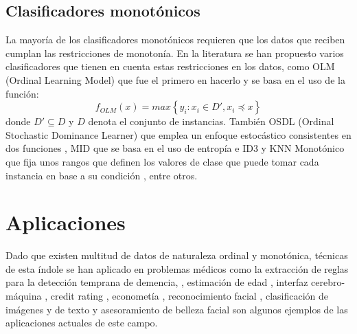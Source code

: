 \subsection{Clasificadores monotónicos}
La mayoría de los clasificadores monotónicos requieren que los datos que reciben cumplan las restricciones de monotonía. En la literatura se han propuesto varios clasificadores que tienen en cuenta estas restricciones en los datos, como OLM (Ordinal Learning Model) \cite{ben1989learning} que fue el primero en hacerlo y se basa en el uso de la función: $$ f_{OLM}(x) = max \left\{ y_i: x_i \in D', x_i \preceq x \right\}$$ donde $D' \subseteq D $ y $D$ denota el conjunto de instancias. También OSDL (Ordinal Stochastic Dominance Learner) que emplea un enfoque estocástico consistentes en dos funciones \cite{lievens2008probabilistic}, MID que se basa en el uso de entropía e ID3 \cite{ben1995monotonicity} y KNN Monotónico que fija unos rangos que definen los valores de clase que puede tomar cada instancia en base a su condición \cite{duivesteijn2008nearest}, entre otros.
\section{Aplicaciones}
Dado que existen multitud de datos de naturaleza ordinal y monotónica, técnicas de esta índole se han aplicado en problemas médicos \cite{bender1997ordinal} como la extracción de reglas para la detección temprana de demencia, \cite{pazzani2001acceptance}, estimación de edad \cite{chang2011ordinal}, interfaz cerebro-máquina \cite{yoon2011bayesian}, credit rating \cite{kwon1997ordinal}, econometía \cite{mathieson1996ordinal}, reconocimiento facial \cite{kim2010structured}, clasificación de imágenes \cite{tian2014comparative} y de texto \cite{baccianella2014feature} y asesoramiento de belleza facial \cite{yan2014cost} son algunos ejemplos de las aplicaciones actuales de este campo.

